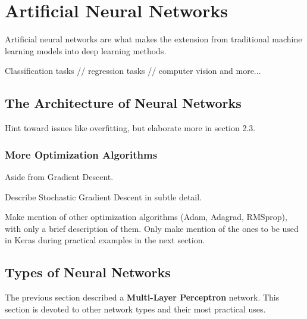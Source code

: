 \chapter{Artificial Neural Networks}

Artificial neural networks are what makes the extension from traditional machine learning models into deep learning methods.

Classification tasks // regression tasks // computer vision and more...

\section{The Architecture of Neural Networks} %

Hint toward issues like overfitting, but elaborate more in section 2.3.

  





\subsection{More Optimization Algorithms}

Aside from Gradient Descent.

Describe Stochastic Gradient Descent in subtle detail.

Make mention of other optimization algorithms (Adam, Adagrad, RMSprop), with only a brief description of them.  Only make mention of the ones to be used in Keras during practical examples in the next section.

\section{Types of Neural Networks} %
The previous section described a \textbf{Multi-Layer Perceptron} network.  This section is devoted to other network types and their most practical uses.

